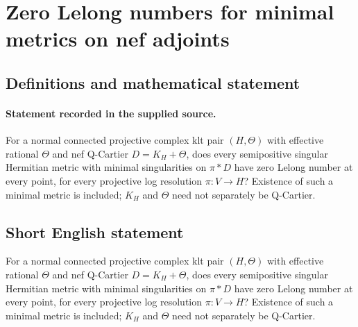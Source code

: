 \documentclass[11pt]{article}
\begin{document}
\section*{Zero Lelong numbers for minimal metrics on nef adjoints}\label{statement}
\subsection{Definitions and mathematical statement}
\paragraph{Statement recorded in the supplied source.}
For a normal connected projective complex klt pair $(H,\Theta )$ with effective rational $\Theta $ and nef Q-Cartier $D=K_H+\Theta $, does every semipositive singular Hermitian metric with minimal singularities on $\pi *D$ have zero Lelong number at every point, for every projective log resolution $\pi :V\to H$? Existence of such a minimal metric is included; $K_H$ and $\Theta $ need not separately be Q-Cartier.
\subsection{Short English statement}
For a normal connected projective complex klt pair $(H,\Theta )$ with effective rational $\Theta $ and nef Q-Cartier $D=K_H+\Theta $, does every semipositive singular Hermitian metric with minimal singularities on $\pi *D$ have zero Lelong number at every point, for every projective log resolution $\pi :V\to H$? Existence of such a minimal metric is included; $K_H$ and $\Theta $ need not separately be Q-Cartier.
\end{document}
